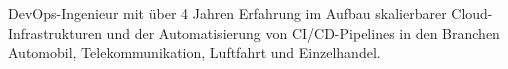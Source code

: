 \small
DevOps-Ingenieur mit über 4 Jahren Erfahrung im Aufbau skalierbarer Cloud-Infrastrukturen und der Automatisierung von CI/CD-Pipelines in den Branchen Automobil, Telekommunikation, Luftfahrt und Einzelhandel.
